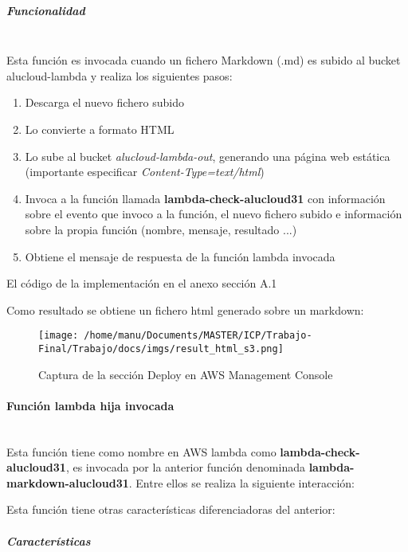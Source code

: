 \documentclass[
]{article}
\begin{document}
\hypertarget{header-n50}{%
\subparagraph{Funcionalidad}\label{header-n50}}
\leavevmode
\newline
\\
Esta función es invocada cuando un fichero Markdown (.md) es subido al
bucket alucloud-lambda y realiza los siguientes pasos:

\begin{enumerate}
\def\labelenumi{\arabic{enumi}.}
\item
  Descarga el nuevo fichero subido
\item
  Lo convierte a formato HTML
\item
  Lo sube al bucket \emph{alucloud-lambda-out}, generando una página web
  estática (importante especificar \emph{Content-Type=text/html})
\item
  Invoca a la función llamada \textbf{lambda-check-alucloud31} con
  información sobre el evento que invoco a la función, el nuevo fichero
  subido e información sobre la propia función (nombre, mensaje,
  resultado ...)
\item
  Obtiene el mensaje de respuesta de la función lambda invocada
\end{enumerate}

El código de la implementación en el anexo sección A.1

Como resultado se obtiene un fichero html generado sobre un markdown:
\begin{figure}[H]
\centering
\texttt{[image: /home/manu/Documents/MASTER/ICP/Trabajo-Final/Trabajo/docs/imgs/result\_html\_s3.png]}
\caption{Captura de la sección Deploy en AWS Management Console}
\end{figure}

\hypertarget{header-n65}{%
\paragraph{Función lambda hija invocada}\label{header-n65}}
\leavevmode
\newline
\\
Esta función tiene como nombre en AWS lambda como
\textbf{lambda-check-alucloud31}, es invocada por la anterior función
denominada \textbf{lambda-markdown-alucloud31}. Entre ellos se realiza
la siguiente interacción:

Esta función tiene otras características diferenciadoras del anterior:

\hypertarget{header-n68}{%
\subparagraph{Características}\label{header-n68}}
\end{document}
